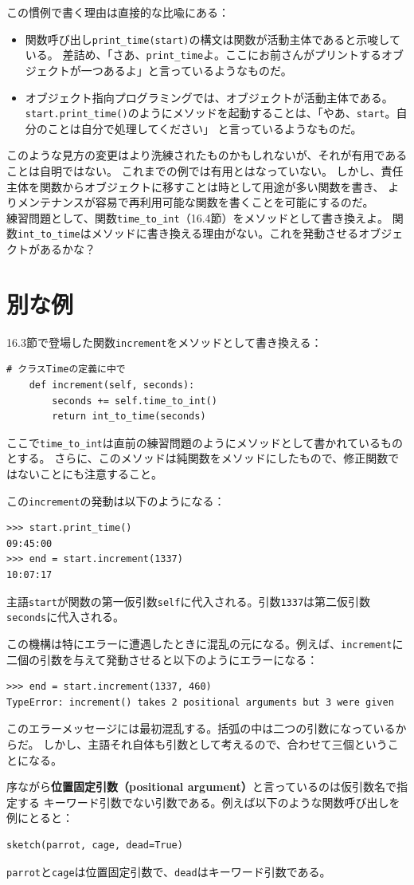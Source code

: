 \documentclass[a4j,12pt,makeidx]{jbook}
\begin{document}
この慣例で書く理由は直接的な比喩にある：
\begin{itemize}
\item 関数呼び出し{\tt print\_time(start)}の構文は関数が活動主体であると示唆している。
差詰め、「さあ、{\tt print\_time}よ。ここにお前さんがプリントするオブジェクトが一つあるよ」と言っているようなものだ。
\item オブジェクト指向プログラミングでは、オブジェクトが活動主体である。
{\tt start.print\_time()}のようにメソッドを起動することは、「やあ、{\tt start}。自分のことは自分で処理してください」
と言っているようなものだ。
\end{itemize}
このような見方の変更はより洗練されたものかもしれないが、それが有用であることは自明ではない。
これまでの例では有用とはなっていない。
しかし、責任主体を関数からオブジェクトに移すことは時として用途が多い関数を書き、
よりメンテナンスが容易で再利用可能な関数を書くことを可能にするのだ。\\
練習問題として、関数{\tt time\_to\_int}（16.4節）をメソッドとして書き換えよ。
関数{\tt int\_to\_time}はメソッドに書き換える理由がない。これを発動させるオブジェクトがあるかな？
%
\section{別な例}
16.3節で登場した関数{\tt increment}をメソッドとして書き換える：
\begin{verbatim}
# クラスTimeの定義に中で
    def increment(self, seconds):
        seconds += self.time_to_int()
        return int_to_time(seconds)
\end{verbatim}
ここで{\tt time\_to\_int}は直前の練習問題のようにメソッドとして書かれているものとする。
さらに、このメソッドは純関数をメソッドにしたもので、修正関数ではないことにも注意すること。\par
この{\tt increment}の発動は以下のようになる：
\begin{verbatim}
>>> start.print_time()
09:45:00
>>> end = start.increment(1337)
10:07:17
\end{verbatim}
主語{\tt start}が関数の第一仮引数{\tt self}に代入される。引数{\tt 1337}は第二仮引数{\tt seconds}に代入される。\par
この機構は特にエラーに遭遇したときに混乱の元になる。例えば、{\tt increment}に二個の引数を与えて発動させると以下のようにエラーになる：
\begin{verbatim}
>>> end = start.increment(1337, 460)
TypeError: increment() takes 2 positional arguments but 3 were given
\end{verbatim}
このエラーメッセージには最初混乱する。括弧の中は二つの引数になっているからだ。
しかし、主語それ自体も引数として考えるので、合わせて三個ということになる。\par
序ながら{\bf 位置固定引数（positional argument）}と言っているのは仮引数名で指定する
キーワード引数でない引数である。例えば以下のような関数呼び出しを例にとると：
\begin{verbatim}
sketch(parrot, cage, dead=True)
\end{verbatim}
{\tt parrot}と{\tt cage}は位置固定引数で、{\tt dead}はキーワード引数である。
%
\end{document}
